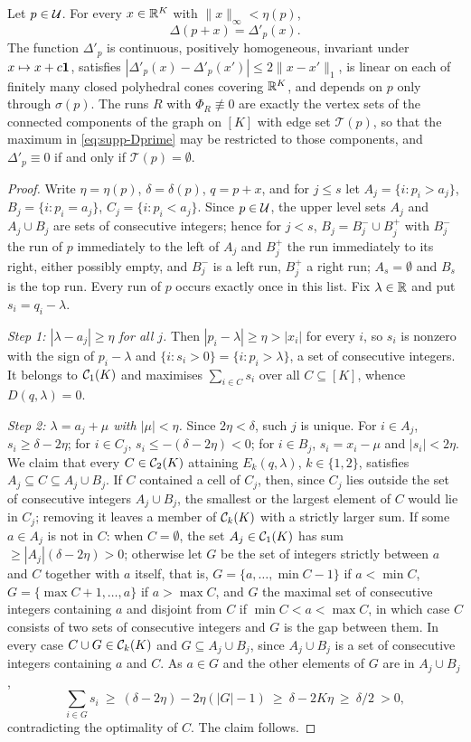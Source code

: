 \begin{lemma}\label{lem:S-local}
Let $p\in\mathcal{U}$. For every $x\in\mathbb{R}^K$ with $\|x\|_\infty<\eta(p)$,
\[
\Delta(p+x)=\Delta'_p(x).
\]
The function $\Delta'_p$ is continuous, positively homogeneous, invariant under $x\mapsto x+c\mathbf{1}$, satisfies $|\Delta'_p(x)-\Delta'_p(x')|\le2\|x-x'\|_1$, is linear on each of finitely many closed polyhedral cones covering $\mathbb{R}^K$, and depends on $p$ only through $\sigma(p)$. The runs $R$ with $\Phi_R\not\equiv0$ are exactly the vertex sets of the connected components of the graph on $[K]$ with edge set $\mathcal T(p)$, so that the maximum in \eqref{eq:supp-Dprime} may be restricted to those components, and $\Delta'_p\equiv0$ if and only if $\mathcal T(p)=\emptyset$.
\end{lemma}

\begin{proof}
Write $\eta=\eta(p)$, $\delta=\delta(p)$, $q=p+x$, and for $j\le s$ let $A_j=\{i:p_i>a_j\}$, $B_j=\{i:p_i=a_j\}$, $C_j=\{i:p_i<a_j\}$. Since $p\in\mathcal{U}$, the upper level sets $A_j$ and $A_j\cup B_j$ are sets of consecutive integers; hence for $j<s$, $B_j=B^-_j\cup B^+_j$ with $B^-_j$ the run of $p$ immediately to the left of $A_j$ and $B^+_j$ the run immediately to its right, either possibly empty, and $B^-_j$ is a left run, $B^+_j$ a right run; $A_s=\emptyset$ and $B_s$ is the top run. Every run of $p$ occurs exactly once in this list. Fix $\lambda\in\mathbb{R}$ and put $s_i=q_i-\lambda$.

\emph{Step 1: $|\lambda-a_j|\ge\eta$ for all $j$.} Then $|p_i-\lambda|\ge\eta>|x_i|$ for every $i$, so $s_i$ is nonzero with the sign of $p_i-\lambda$ and $\{i:s_i>0\}=\{i:p_i>\lambda\}$, a set of consecutive integers. It belongs to $\mathcal{C}_1(K)$ and maximises $\sum_{i\in C}s_i$ over all $C\subseteq[K]$, whence $D(q,\lambda)=0$.

\emph{Step 2: $\lambda=a_j+\mu$ with $|\mu|<\eta$.} Since $2\eta<\delta$, such $j$ is unique. For $i\in A_j$, $s_i\ge\delta-2\eta$; for $i\in C_j$, $s_i\le-(\delta-2\eta)<0$; for $i\in B_j$, $s_i=x_i-\mu$ and $|s_i|<2\eta$. We claim that every $C\in\mathcal{C}_2(K)$ attaining $E_k(q,\lambda)$, $k\in\{1,2\}$, satisfies $A_j\subseteq C\subseteq A_j\cup B_j$. If $C$ contained a cell of $C_j$, then, since $C_j$ lies outside the set of consecutive integers $A_j\cup B_j$, the smallest or the largest element of $C$ would lie in $C_j$; removing it leaves a member of $\mathcal{C}_k(K)$ with a strictly larger sum. If some $a\in A_j$ is not in $C$: when $C=\emptyset$, the set $A_j\in\mathcal{C}_1(K)$ has sum $\ge|A_j|(\delta-2\eta)>0$; otherwise let $G$ be the set of integers strictly between $a$ and $C$ together with $a$ itself, that is, $G=\{a,\dots,\min C-1\}$ if $a<\min C$, $G=\{\max C+1,\dots,a\}$ if $a>\max C$, and $G$ the maximal set of consecutive integers containing $a$ and disjoint from $C$ if $\min C<a<\max C$, in which case $C$ consists of two sets of consecutive integers and $G$ is the gap between them. In every case $C\cup G\in\mathcal{C}_k(K)$ and $G\subseteq A_j\cup B_j$, since $A_j\cup B_j$ is a set of consecutive integers containing $a$ and $C$. As $a\in G$ and the other elements of $G$ are in $A_j\cup B_j$,
\[
\sum_{i\in G}s_i\ \ge\ (\delta-2\eta)-2\eta(|G|-1)\ \ge\ \delta-2K\eta\ \ge\ \delta/2\ >0,
\]
contradicting the optimality of $C$. The claim follows.


\end{proof}
